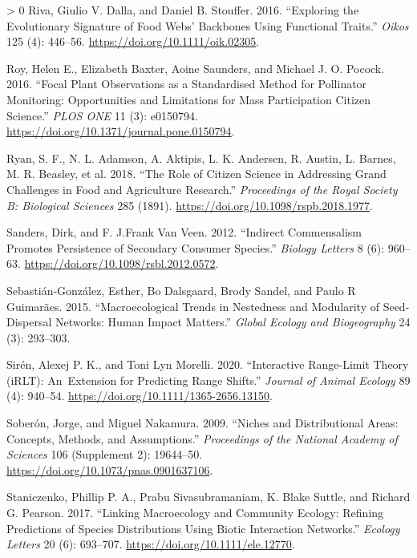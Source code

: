 \documentclass[11pt]{article}
\newlength{\cslhangindent}
\newenvironment{CSLReferences}[3] %
 {%
  \setlength{\parindent}{0pt}
  \ifodd #1 \everypar{\setlength{\hangindent}{\cslhangindent}}\ignorespaces\fi
  \ifnum #2 > 0
  \setlength{\parskip}{#2\baselineskip}
  \fi
 }%
 {}
\begin{document}
\begin{CSLReferences}{1}{0}
\leavevmode\hypertarget{ref-Riva2016ExpEvo}{}%
Riva, Giulio V. Dalla, and Daniel B. Stouffer. 2016. {``Exploring the
Evolutionary Signature of Food Webs' Backbones Using Functional
Traits.''} \emph{Oikos} 125 (4): 446--56.
\url{https://doi.org/10.1111/oik.02305}.

\leavevmode\hypertarget{ref-Roy2016FocPla}{}%
Roy, Helen E., Elizabeth Baxter, Aoine Saunders, and Michael J. O.
Pocock. 2016. {``Focal Plant Observations as a Standardised Method for
Pollinator Monitoring: Opportunities and Limitations for Mass
Participation Citizen Science.''} \emph{PLOS ONE} 11 (3): e0150794.
\url{https://doi.org/10.1371/journal.pone.0150794}.

\leavevmode\hypertarget{ref-Ryan2018RolCit}{}%
Ryan, S. F., N. L. Adamson, A. Aktipis, L. K. Andersen, R. Austin, L.
Barnes, M. R. Beasley, et al. 2018. {``The Role of Citizen Science in
Addressing Grand Challenges in Food and Agriculture Research.''}
\emph{Proceedings of the Royal Society B: Biological Sciences} 285
(1891). \url{https://doi.org/10.1098/rspb.2018.1977}.

\leavevmode\hypertarget{ref-Sanders2012IndCom}{}%
Sanders, Dirk, and F. J.Frank Van Veen. 2012. {``Indirect Commensalism
Promotes Persistence of Secondary Consumer Species.''} \emph{Biology
Letters} 8 (6): 960--63. \url{https://doi.org/10.1098/rsbl.2012.0572}.

\leavevmode\hypertarget{ref-Sebastian-Gonzalez2015MacTre}{}%
Sebastián-González, Esther, Bo Dalsgaard, Brody Sandel, and Paulo R
Guimarães. 2015. {``Macroecological Trends in Nestedness and Modularity
of Seed-Dispersal Networks: Human Impact Matters.''} \emph{Global
Ecology and Biogeography} 24 (3): 293--303.

\leavevmode\hypertarget{ref-Siren2020IntRan}{}%
Sirén, Alexej P. K., and Toni Lyn Morelli. 2020. {``Interactive
Range-Limit Theory (iRLT): An~Extension for Predicting Range Shifts.''}
\emph{Journal of Animal Ecology} 89 (4): 940--54.
\url{https://doi.org/10.1111/1365-2656.13150}.

\leavevmode\hypertarget{ref-Soberon2009NicDis}{}%
Soberón, Jorge, and Miguel Nakamura. 2009. {``Niches and Distributional
Areas: Concepts, Methods, and Assumptions.''} \emph{Proceedings of the
National Academy of Sciences} 106 (Supplement 2): 19644--50.
\url{https://doi.org/10.1073/pnas.0901637106}.

\leavevmode\hypertarget{ref-Staniczenko2017LinMac}{}%
Staniczenko, Phillip P. A., Prabu Sivasubramaniam, K. Blake Suttle, and
Richard G. Pearson. 2017. {``Linking Macroecology and Community Ecology:
Refining Predictions of Species Distributions Using Biotic Interaction
Networks.''} \emph{Ecology Letters} 20 (6): 693--707.
\url{https://doi.org/10.1111/ele.12770}.


\end{CSLReferences}
\end{document}

